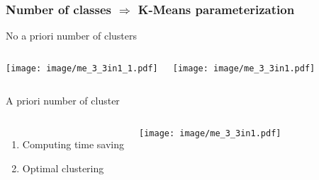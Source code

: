 		\begin{frame}
		\frametitle{Number of classes $\Rightarrow$ K-Means parameterization}
		\begin{exampleblock}{No a priori number of clusters\footnotemark[1]}
		
		\begin{columns}[c]	
			\column{18em}
				\begin{center}
					\texttt{[image: image/me\_3\_3in1\_1.pdf]}
				\end{center}
			\column{18em}
				\begin{center}		
					\texttt{[image: image/me\_3\_3in1.pdf]}
				\end{center}					
		\end{columns}\vspace{1em}
		
		\end{exampleblock}
		
		\begin{exampleblock}{A priori number of cluster}
		
		\begin{columns}[c]	
			\column{14em}	
			\begin{enumerate}
				\item Computing time saving
				\item Optimal clustering
			\end{enumerate}			
			\column{18em}
				\begin{center}		
					\texttt{[image: image/me\_3\_3in1.pdf]}
				\end{center}					
		\end{columns}\vspace{1em}				
		\end{exampleblock}
		\end{frame}
	

